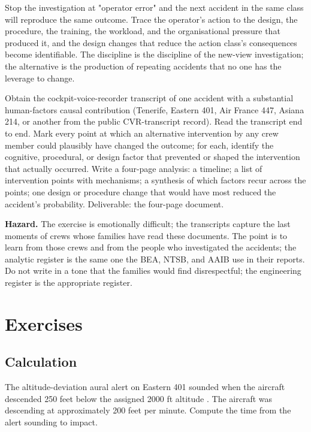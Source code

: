 \begin{principle}
Stop the investigation at "operator error" and the next accident in the same class will reproduce the same outcome. Trace the operator's action to the design, the procedure, the training, the workload, and the organisational pressure that produced it, and the design changes that reduce the action class's consequences become identifiable. The discipline is the discipline of the new-view investigation; the alternative is the production of repeating accidents that no one has the leverage to change.
\end{principle}

\begin{project}
Obtain the cockpit-voice-recorder transcript of one accident with a substantial human-factors causal contribution (Tenerife, Eastern 401, Air France 447, Asiana 214, or another from the public CVR-transcript record). Read the transcript end to end. Mark every point at which an alternative intervention by any crew member could plausibly have changed the outcome; for each, identify the cognitive, procedural, or design factor that prevented or shaped the intervention that actually occurred. Write a four-page analysis: a timeline; a list of intervention points with mechanisms; a synthesis of which factors recur across the points; one design or procedure change that would have most reduced the accident's probability. Deliverable: the four-page document.

\textbf{Hazard.} The exercise is emotionally difficult; the transcripts capture the last moments of crews whose families have read these documents. The point is to learn from those crews and from the people who investigated the accidents; the analytic register is the same one the BEA, NTSB, and AAIB use in their reports. Do not write in a tone that the families would find disrespectful; the engineering register is the appropriate register.
\end{project}

\section{Exercises}

\subsection*{Calculation}

\begin{exercise}
The altitude-deviation aural alert on Eastern 401 sounded when the aircraft descended 250 feet below the assigned 2000 ft altitude \cite{acc:ntsb-aar73-14}. The aircraft was descending at approximately 200 feet per minute. Compute the time from the alert sounding to impact.
\end{exercise}

